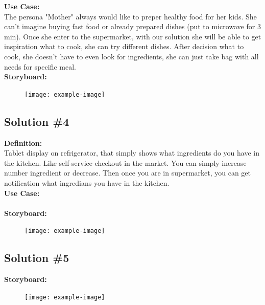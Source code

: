 \documentclass[a4paper,10pt,oneside]{scrreprt}
\begin{document}
			\noindent \textbf{Use Case:}\\
			The persona "Mother" always would like to preper healthy food for her kids. She can't imagine buying fast food or already prepared dishes (put to microwave for 3 min). Once she enter to the supermarket, with our solution she will be able to get inspiration what to cook, she can try different dishes. After decision what to cook, she doesn't have to even look for ingredients, she can just take bag with all needs for specific meal.\\
		
			\noindent \textbf{Storyboard:}\\
			
			\begin{figure}[H]
				\centering
				\texttt{[image: example-image]}
			\end{figure}
		
		\subsection{Solution \#4}
		
		\noindent \textbf{Definition:}\\
			Tablet display on refrigerator, that simply shows what ingredients do you have in the kitchen. Like self-service checkout
in the market. You can simply increase number ingredient or decrease. Then once you are in supermarket, you can get notification what ingredians you have in the kitchen.\\
			
			\noindent \textbf{Use Case:}\\
			\\
		
			\noindent \textbf{Storyboard:}\\
			
			\begin{figure}[H]
				\centering
				\texttt{[image: example-image]}
			\end{figure}
		
		\subsection{Solution \#5}
		
			\noindent \textbf{Storyboard:}\\
			
			\begin{figure}[H]
				\centering
				\texttt{[image: example-image]}
			\end{figure}
		
\end{document}
